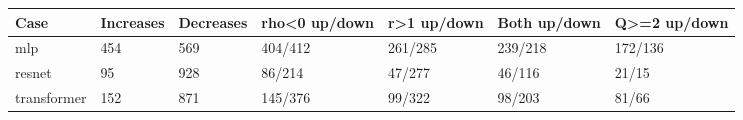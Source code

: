 \begin{tabular}{@{}lllllll@{}}
\toprule
Case & Increases & Decreases & rho<0 up/down & r>1 up/down & Both up/down & Q>=2 up/down \\
\midrule
mlp & 454 & 569 & 404/412 & 261/285 & 239/218 & 172/136 \\
resnet & 95 & 928 & 86/214 & 47/277 & 46/116 & 21/15 \\
transformer & 152 & 871 & 145/376 & 99/322 & 98/203 & 81/66 \\
\bottomrule
\end{tabular}
